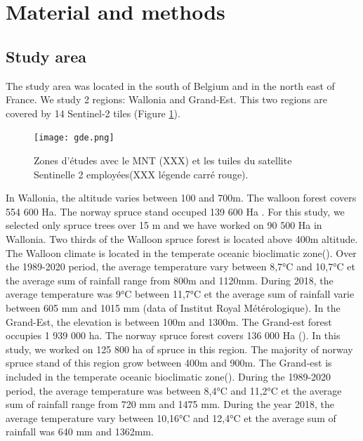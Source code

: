 \documentclass[3p,times]{elsarticle}
\begin{document}
\section{Material and methods}
\subsection{Study area}
The study area was located in the south of Belgium and in the north east of France. We study 2 regions: Wallonia and Grand-Est. This two regions are covered by 14 Sentinel-2 tiles (Figure \ref{fig:situ}).
\begin{figure} [htbp] 
	\centering
	\texttt{[image: gde.png]}
	\caption{Zones d'études avec le MNT (XXX) et les tuiles du satellite Sentinelle 2 employées(XXX légende carré rouge).}
	\label{fig:situ}
\end{figure}
In Wallonia, the altitude varies between 100 and 700m. The walloon forest covers 554 600 Ha. The norway spruce stand occuped 139 600 Ha \citep{Alderweireld_2015}. For this study, we selected only spruce trees over 15 m and we have worked on 90 500 Ha in Wallonia. Two thirds of the Walloon spruce forest is located above 400m altitude. The Walloon climate is located in the temperate oceanic bioclimatic zone(\citep{lindner_climate_2010}). Over the 1989-2020 period, the average temperature vary between 8,7°C and 10,7°C et the average sum of rainfall range from 800m and 1120mm. During 2018, the average temperature was 9°C between 11,7°C et the average sum of rainfall varie between 605 mm and 1015 mm (data of Institut Royal Métérologique).%
 In the Grand-Est, the elevation is between 100m and 1300m. The Grand-est forest occupies 1 939 000 ha. The norway spruce forest covers 136 000 Ha (\citep{francais_donnees_2022}). In this study, we worked on 125 800 ha of spruce in this region. The majority of norway spruce stand of this region grow between 400m and 900m. The Grand-est is included in the temperate oceanic bioclimatic zone(\citep{lindner_climate_2010}). During the 1989-2020 period, the average temperature was between  8,4°C and 11,2°C et the average sum of rainfall range from 720 mm and 1475 mm. During the year 2018, the average temperature vary between 10,16°C and 12,4°C et the average sum of rainfall was 640 mm and 1362mm.
\end{document}
